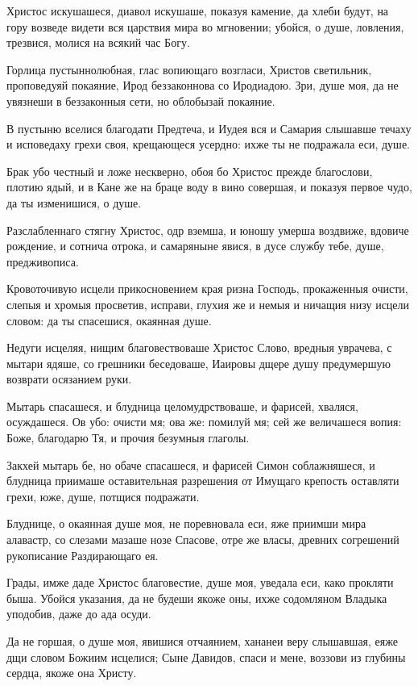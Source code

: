 Христос искушашеся, диавол искушаше, показуя камение, да хлеби будут, на гору возведе видети вся царствия мира во мгновении; убойся, о душе, ловления, трезвися, молися на всякий час Богу.


Горлица пустыннолюбная, глас вопиющаго возгласи, Христов светильник, проповедуяй покаяние, Ирод беззаконнова со Иродиадою. Зри, душе моя, да не увязнеши в беззаконныя сети, но облобызай покаяние.


В пустыню вселися благодати Предтеча, и Иудея вся и Самария слышавше течаху и исповедаху грехи своя, крещающеся усердно: ихже ты не подражала еси, душе.


Брак убо честный и ложе нескверно, обоя бо Христос прежде благослови, плотию ядый, и в Кане же на браце воду в вино совершая, и показуя первое чудо, да ты изменишися, о душе.


Разслабленнаго стягну Христос, одр вземша, и юношу умерша воздвиже, вдовиче рождение, и сотнича отрока, и самаряныне явися, в дусе службу тебе, душе, предживописа.


Кровоточивую исцели прикосновением края ризна Господь, прокаженныя очисти, слепыя и хромыя просветив, исправи, глухия же и немыя и ничащия низу исцели словом: да ты спасешися, окаянная душе.


Недуги исцеляя, нищим благовествоваше Христос Слово, вредныя уврачева, с мытари ядяше, со грешники беседоваше, Иаировы дщере душу предумершую возврати осязанием руки.


Мытарь спасашеся, и блудница целомудрствоваше, и фарисей, хваляся, осуждашеся. Ов убо: очисти мя; ова же: помилуй мя; сей же величашеся вопия: Боже, благодарю Тя, и прочия безумныя глаголы.


Закхей мытарь бе, но обаче спасашеся, и фарисей Симон соблажняшеся, и блудница приимаше оставительная разрешения от Имущаго крепость оставляти грехи, юже, душе, потщися подражати.


Блуднице, о окаянная душе моя, не поревновала еси, яже приимши мира алавастр, со слезами мазаше нозе Спасове, отре же власы, древних согрешений рукописание Раздирающаго ея.


Грады, имже даде Христос благовестие, душе моя, уведала еси, како прокляти быша. Убойся указания, да не будеши якоже оны, ихже содомляном Владыка уподобив, даже до ада осуди.


Да не горшая, о душе моя, явишися отчаянием, хананеи веру слышавшая, еяже дщи словом Божиим исцелися; Сыне Давидов, спаси и мене, воззови из глубины сердца, якоже она Христу.



